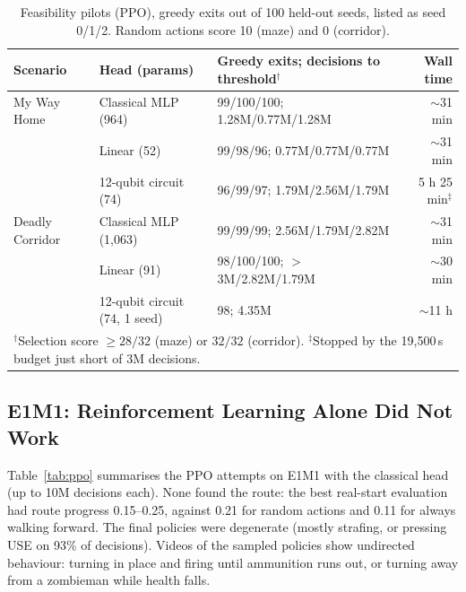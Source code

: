\documentclass[10pt, a4paper]{article}
\begin{document}
\begin{table}[htbp]
\centering
\footnotesize
\renewcommand{\arraystretch}{1.1}
\caption{Feasibility pilots (PPO), greedy exits out of 100 held-out seeds, listed as seed 0/1/2. Random actions score 10 (maze) and 0 (corridor).}
\label{tab:pilots}
\begin{tabularx}{\textwidth}{llXr}
\toprule
\textbf{Scenario} & \textbf{Head (params)} & \textbf{Greedy exits; decisions to threshold$^{\dagger}$} & \textbf{Wall time} \\
\midrule
My Way Home & Classical MLP (964) & 99/100/100; 1.28M/0.77M/1.28M & $\sim$31 min \\
 & Linear (52) & 99/98/96; 0.77M/0.77M/0.77M & $\sim$31 min \\
 & 12-qubit circuit (74) & 96/99/97; 1.79M/2.56M/1.79M & 5 h 25 min$^{\ddagger}$ \\
Deadly Corridor & Classical MLP (1,063) & 99/99/99; 2.56M/1.79M/2.82M & $\sim$31 min \\
 & Linear (91) & 98/100/100; $>$3M/2.82M/1.79M & $\sim$30 min \\
 & 12-qubit circuit (74, 1 seed) & 98; 4.35M & $\sim$11 h \\
\bottomrule
\multicolumn{4}{l}{\scriptsize $^{\dagger}$Selection score $\geq28/32$ (maze) or $32/32$ (corridor). $^{\ddagger}$Stopped by the 19{,}500\,s budget just short of 3M decisions.}
\end{tabularx}
\end{table}

\subsection{E1M1: Reinforcement Learning Alone Did Not Work}
\label{sec:ppo_attempts}
Table~\ref{tab:ppo} summarises the PPO attempts on E1M1 with the classical head (up to 10M decisions each). None found the route: the best real-start evaluation had route progress 0.15--0.25, against 0.21 for random actions and 0.11 for always walking forward. The final policies were degenerate (mostly strafing, or pressing USE on 93\% of decisions). Videos of the sampled policies show undirected behaviour: turning in place and firing until ammunition runs out, or turning away from a zombieman while health falls.
\end{document}
